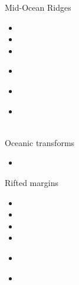 
Mid-Ocean Ridges
\begin{small}
\begin{itemize}
\item[\twothousandsixteen] 
\item[\twothousandseventeen] 
\item[\twothousandeighteen] 
\item[\twothousandtwentyone] 
\\ 
\item[\twothousandtwentytwo] 
 \\
\item[\twothousandtwentythree] 
\\
\\
\end{itemize}
\end{small}

Oceanic transforms
\begin{small}
\begin{itemize}
\item[\twothousandtwentyone] 
\end{itemize}
\end{small}


Rifted margins
\begin{small}
\begin{itemize}
\item[\twothousandseventeen] 
\item[\twothousandnineteen] 
\item[\twothousandtwenty] 
\item[\twothousandtwentyone] 
\item[\twothousandtwentytwo] 
 \\
\item[\twothousandtwentythree] 
 \\
 \\ 
\end{itemize}
\end{small}



